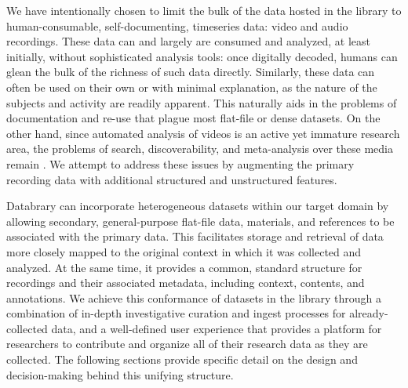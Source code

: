 \documentclass{sig-alternate}
\begin{document}
We have intentionally chosen to limit the bulk of the data hosted in the library to human-consumable, self-documenting, timeseries data: video and audio recordings.
These data can and largely are consumed and analyzed, at least initially, without sophisticated analysis tools: once digitally decoded, humans can glean the bulk of the richness of such data directly.
Similarly, these data can often be used on their own or with minimal explanation, as the nature of the subjects and activity are readily apparent.
This naturally aids in the problems of documentation and re-use that plague most flat-file or dense datasets.
On the other hand, since automated analysis of videos is an active yet immature research area, the problems of search, discoverability, and meta-analysis over these media remain \cite{Albertson_2013}.
We attempt to address these issues by augmenting the primary recording data with additional structured and unstructured features.

Databrary can incorporate heterogeneous datasets within our target domain by allowing secondary, general-purpose flat-file data, materials, and references to be associated with the primary data.
This facilitates storage and retrieval of data more closely mapped to the original context in which it was collected and analyzed.
At the same time, it provides a common, standard structure for recordings and their associated metadata, including context, contents, and annotations.
We achieve this conformance of datasets in the library through a combination of in-depth investigative curation and ingest processes for already-collected data, and a well-defined user experience that provides a platform for researchers to contribute and organize all of their research data as they are collected.
The following sections provide specific detail on the design and decision-making behind this unifying structure.
\end{document}
